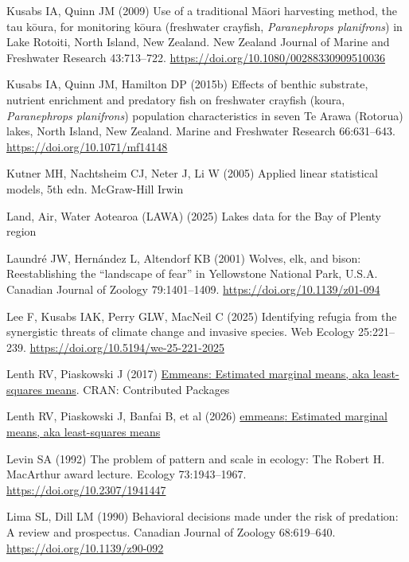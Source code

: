 \documentclass[
  12pt,
  a4paper,
]{scrbook}
\newlength{\cslhangindent}
\newenvironment{CSLReferences}[2] %
 {\begin{list}{}{%
  \setlength{\itemindent}{0pt}
  \setlength{\leftmargin}{0pt}
  \setlength{\parsep}{0pt}
  \ifodd #1
   \setlength{\leftmargin}{\cslhangindent}
   \setlength{\itemindent}{-1\cslhangindent}
  \fi
  \setlength{\itemsep}{#2\baselineskip}}}
 {\end{list}}
\begin{document}
\begin{CSLReferences}{1}{1}
Kusabs IA, Quinn JM (2009) Use of a traditional {Māori} harvesting
method, the tau k{ō}ura, for monitoring k{ō}ura (freshwater crayfish,
{\emph{Paranephrops planifrons}}) in {Lake Rotoiti}, {North Island, New
Zealand}. New Zealand Journal of Marine and Freshwater Research
43:713--722. \url{https://doi.org/10.1080/00288330909510036}

Kusabs IA, Quinn JM, Hamilton DP (2015b) Effects of benthic substrate,
nutrient enrichment and predatory fish on freshwater crayfish (koura,
{\emph{Paranephrops planifrons}}) population characteristics in seven
{Te Arawa} ({Rotorua}) lakes, {North Island}, {New Zealand}. Marine and
Freshwater Research 66:631--643. \url{https://doi.org/10.1071/mf14148}

Kutner MH, Nachtsheim CJ, Neter J, Li W (2005) Applied linear
statistical models, 5th edn. McGraw-Hill Irwin

Land, Air, Water Aotearoa (LAWA) (2025) Lakes data for the {Bay of
Plenty} region

Laundré JW, Hernández L, Altendorf KB (2001) Wolves, elk, and bison:
Reestablishing the {``landscape of fear''} in {Yellowstone National
Park}, {U.S.A.} Canadian Journal of Zoology 79:1401--1409.
\url{https://doi.org/10.1139/z01-094}

Lee F, Kusabs IAK, Perry GLW, MacNeil C (2025) Identifying refugia from
the synergistic threats of climate change and invasive species. Web
Ecology 25:221--239. \url{https://doi.org/10.5194/we-25-221-2025}

Lenth RV, Piaskowski J (2017)
\href{https://doi.org/10.32614/cran.package.emmeans}{Emmeans: Estimated
marginal means, aka least-squares means}. CRAN: Contributed Packages

Lenth RV, Piaskowski J, Banfai B, et al (2026)
\href{https://cran.r-project.org/web/packages/emmeans/index.html}{{emmeans}:
Estimated marginal means, aka least-squares means}

Levin SA (1992) The problem of pattern and scale in ecology: The {Robert
H. MacArthur} award lecture. Ecology 73:1943--1967.
\url{https://doi.org/10.2307/1941447}

Lima SL, Dill LM (1990) Behavioral decisions made under the risk of
predation: A review and prospectus. Canadian Journal of Zoology
68:619--640. \url{https://doi.org/10.1139/z90-092}


\end{CSLReferences}
\end{document}
